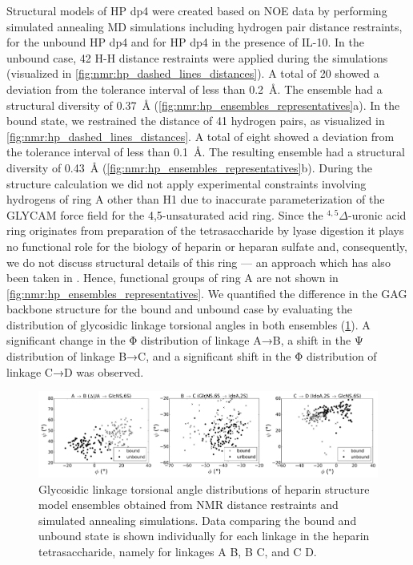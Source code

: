 Structural models of HP dp4 were created based on NOE data by performing
simulated annealing MD simulations including hydrogen pair distance restraints,
for the unbound HP dp4 and for HP dp4 in the presence of IL-10. In the unbound
case, 42 H-H distance restraints were applied during the simulations (visualized
in \cref{fig:nmr:hp_dashed_lines_distances}). A total of 20 showed a deviation
from the tolerance interval of less than \SI{0.2}{\angstrom}. The ensemble had a
structural diversity of \SI{0.37}{\angstrom}
(\cref{fig:nmr:hp_ensembles_representatives}a). In the bound state, we
restrained the distance of 41 hydrogen pairs, as visualized in
\cref{fig:nmr:hp_dashed_lines_distances}. A total of eight showed a deviation
from the tolerance interval of less than \SI{0.1}{\angstrom}. The resulting
ensemble had a structural diversity of \SI{0.43}{\angstrom}
(\cref{fig:nmr:hp_ensembles_representatives}b). During the structure calculation
we did not apply experimental constraints involving hydrogens of ring A other
than H1 due to inaccurate parameterization of the GLYCAM force field for the
4,5-unsaturated acid ring. Since the ${}^{4,5}\Delta$-uronic acid ring
originates from preparation of the tetrasaccharide by lyase digestion it plays
no functional role for the biology of heparin or heparan sulfate and,
consequently, we do not discuss structural details of this ring --- an approach
which has also been taken in \cite{jin_heparin_2009}. Hence, functional groups
of ring A are not shown in \cref{fig:nmr:hp_ensembles_representatives}. We
quantified the difference in the GAG backbone structure for the bound and
unbound case by evaluating the distribution of glycosidic linkage torsional
angles in both ensembles (\cref{fig:nmr:hp_glyco_dihedral_distributions}). A
significant change in the Φ distribution of linkage A→B, a shift in the Ψ
distribution of linkage B→C, and a significant shift in the Φ distribution of
linkage C→D was observed.





\begin{figure}
\begin{adjustwidth}{-2cm}{-2cm}
\centering
\includegraphics[width=1.3\textwidth]{gfx/nmr/Figure_08_glycolinkage_dihedrals_bound_vs_free_three_3panels_05.png}
\caption[]{
Glycosidic linkage torsional angle distributions of heparin structure model
ensembles obtained from NMR distance restraints and simulated annealing
simulations. Data comparing the bound and unbound state is shown individually
for each linkage in the heparin tetrasaccharide, namely for linkages A
\rightarrow B, B \rightarrow C, and C \rightarrow D.
}
\label{fig:nmr:hp_glyco_dihedral_distributions}
\end{adjustwidth}
\end{figure}

